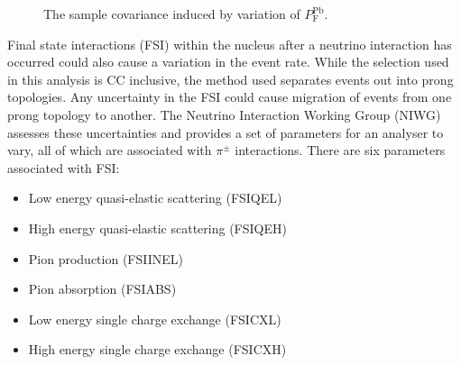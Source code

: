 \begin{figure}%
  \centering
  \caption{The sample covariance induced by variation of $P_{\textrm{F}}^{\textrm{Pb}}$.}
  \label{fig:PbXSecCovarianceMatrices}
\end{figure}
\newline
\newline
Final state interactions (FSI) within the nucleus after a neutrino interaction has occurred could also cause a variation in the event rate.  While the selection used in this analysis is CC inclusive, the method used separates events out into prong topologies.  Any uncertainty in the FSI could cause migration of events from one prong topology to another.  The Neutrino Interaction Working Group (NIWG) assesses these uncertainties and provides a set of parameters for an analyser to vary, all of which are associated with $\pi^{\pm}$ interactions.  There are six parameters associated with FSI:
\begin{itemize}
  \item Low energy quasi-elastic scattering (FSIQEL)
  \item High energy quasi-elastic scattering (FSIQEH)
  \item Pion production (FSIINEL)
  \item Pion absorption (FSIABS)
  \item Low energy single charge exchange (FSICXL)
  \item High energy single charge exchange (FSICXH)
\end{itemize}
